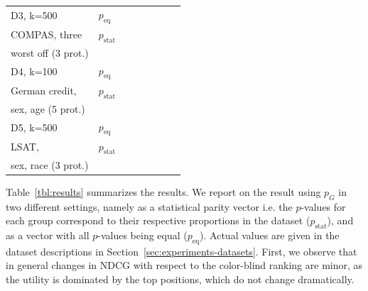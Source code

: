 \begin{table}[t]
{\begin{tabular}{llcccccc}
			D3, k=500 & \algoFAIR  $p_{\text{eq}}$ &  & \textbf{} & \textbf{} & \textbf{} & \textbf{} \\
			COMPAS, three & \algoFAIR  $p_{\text{stat}}$ &  & \textbf{} & \textbf{} & \textbf{} & \textbf{} \\
			worst off (3 prot.) & \citeauthor{zehlike2020matching} &  &  &  &  &  \\ 
			\midrule
			
			D4, k=100 & \algoFAIR $p_{\text{eq}}$ &  & \textbf{} & \textbf{} & \textbf{} & \textbf{} \\
			German credit, & \algoFAIR $p_{\text{stat}}$ &  & \textbf{} & \textbf{} & \textbf{} & \textbf{} \\
			sex, age (5 prot.) & \citeauthor{zehlike2020matching} &  &  &  &  &  \\ 
			\midrule
			
			D5, k=500 & \algoFAIR $p_{\text{eq}}$ &  & \textbf{} & \textbf{} & \textbf{} & \textbf{} \\
			LSAT,& \algoFAIR $p_{\text{stat}}$ &  & \textbf{} & \textbf{} & \textbf{} & \textbf{} \\
			sex, race (3 prot.) & \citeauthor{zehlike2020matching} &  &  &  &  & \textbf{} \\ 
			
			\bottomrule
		\end{tabular}
	}
	\vspace{-3mm}
\end{table}
%
Table~\ref{tbl:results} summarizes the results. We report on the result using $p_G$ in two different settings, namely as a statistical parity vector i.e. the $p$-values for each group correspond to their respective proportions in the dataset ($p_{\text{stat}}$), and as a vector with all $p$-values being equal ($p_{\text{eq}}$). 
%
Actual values are given in the dataset descriptions in Section~\ref{sec:experiments-datasets}. 
%
First, we observe that in general changes in NDCG with respect to the color-blind ranking are minor, as the utility is dominated by the top positions, which do not change dramatically.
%

